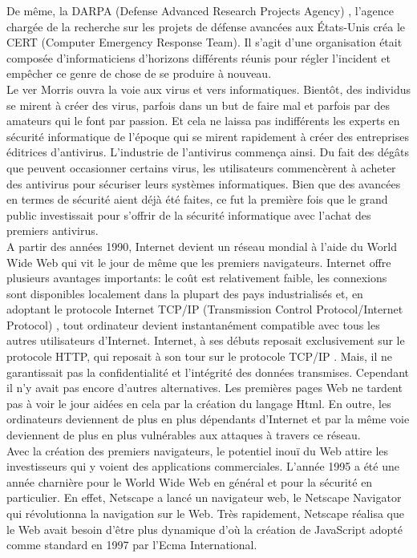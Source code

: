 De même, la DARPA (Defense Advanced Research Projects Agency) , l'agence chargée de la recherche sur les projets de défense avancées aux États-Unis créa le CERT  (Computer Emergency Response Team). Il s'agit d'une organisation était composée d’informaticiens d’horizons différents réunis pour régler l’incident et empêcher ce genre de chose de se produire à nouveau. \\
Le ver Morris ouvra la voie aux virus et vers informatiques. Bientôt, des individus se mirent à créer des virus, parfois dans un but de faire mal et parfois par des amateurs qui le font par passion. Et cela ne laissa pas indifférents les experts en sécurité informatique de l’époque qui se mirent rapidement à créer des entreprises éditrices d’antivirus. L’industrie de l’antivirus commença ainsi. Du fait des dégâts que peuvent occasionner certains virus, les utilisateurs commencèrent à acheter des antivirus pour sécuriser leurs systèmes informatiques. Bien que des avancées en termes de sécurité aient déjà été faites, ce fut la première fois que le grand public investissait pour s’offrir de la sécurité informatique avec l’achat des premiers antivirus.\\
A partir des années 1990, Internet devient un réseau mondial à l’aide du World Wide Web qui vit le jour de même que les premiers navigateurs. Internet offre plusieurs avantages importants: le coût est relativement faible, les connexions sont disponibles localement dans la plupart des pays industrialisés et, en adoptant le protocole Internet TCP/IP (Transmission Control Protocol/Internet Protocol) , tout ordinateur devient instantanément compatible avec tous les autres utilisateurs d'Internet. 
Internet, à ses débuts reposait exclusivement sur le protocole HTTP, qui reposait à son tour sur le protocole TCP/IP \cite{internet}. Mais, il ne garantissait pas la confidentialité et l’intégrité des données transmises. Cependant il n’y avait pas encore d’autres alternatives.
Les premières pages Web ne tardent pas à voir le jour aidées en cela par la création du langage Html. En outre, les ordinateurs deviennent de plus en plus dépendants d’Internet et par la même voie deviennent de plus en plus vulnérables aux attaques à travers ce réseau.\\
Avec la création des premiers navigateurs, le potentiel inouï du Web attire les investisseurs qui y voient des applications commerciales. L'année 1995 a été une année charnière pour le World Wide Web en général et pour la sécurité en particulier. En effet, Netscape a lancé un navigateur web, le Netscape Navigator qui révolutionna la navigation sur le Web. Très rapidement, Netscape réalisa que le Web avait besoin d’être plus dynamique d’où la création de JavaScript adopté comme standard en 1997 par l’Ecma International. \\

